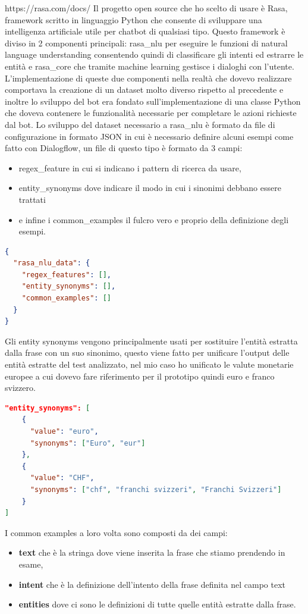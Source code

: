 https://rasa.com/docs/
\fi
Il progetto open source che ho scelto di usare è Rasa, framework scritto in linguaggio Python che consente di sviluppare una intelligenza artificiale utile per chatbot di qualsiasi tipo.
Questo framework è diviso in 2 componenti principali: rasa\_nlu per eseguire le funzioni di natural language understanding consentendo quindi di classificare gli intenti ed estrarre le entità e rasa\_core che tramite machine learning gestisce i dialoghi con l'utente.
L'implementazione di queste due componenti nella realtà che dovevo realizzare comportava la creazione di un dataset molto diverso rispetto al precedente e inoltre lo sviluppo del bot era fondato sull'implementazione di una classe Python che doveva contenere le funzionalità necessarie per completare le azioni richieste dal bot.
Lo sviluppo del dataset necessario a rasa\_nlu è formato da file di configurazione in formato JSON in cui è necessario definire alcuni esempi come fatto con Dialogflow, un file di questo tipo è formato da 3 campi:
\begin{itemize}
\item regex\_feature in cui si indicano i pattern di ricerca da usare,
\item entity\_synonyms dove indicare il modo in cui i sinonimi debbano essere trattati
\item e infine i common\_examples il fulcro vero e proprio della definizione degli esempi.
\end{itemize}
\begin{lstlisting}[language=json,firstnumber=1]
{
  "rasa_nlu_data": {
    "regex_features": [],
    "entity_synonyms": [],
    "common_examples": []
  }
}
\end{lstlisting}
Gli entity synonyms vengono principalmente usati per sostituire l'entità estratta dalla frase con un suo sinonimo, questo viene fatto per unificare l'output delle entità estratte del test analizzato, nel mio caso ho unificato le valute monetarie europee a cui dovevo fare riferimento per il prototipo quindi euro e franco svizzero.
\begin{lstlisting}[language=json,firstnumber=1]
"entity_synonyms": [
    {
      "value": "euro",
      "synonyms": ["Euro", "eur"]
    },
    {
      "value": "CHF",
      "synonyms": ["chf", "franchi svizzeri", "Franchi Svizzeri"]
    }
]
\end{lstlisting}
I common examples a loro volta sono composti da dei campi:
\begin{itemize}
\item \textbf{text} che è la stringa dove viene inserita la frase che stiamo prendendo in esame, \
\item \textbf{intent} che è la definizione dell'intento della frase definita nel campo text
\item \textbf{entities} dove ci sono le definizioni di tutte quelle entità estratte dalla frase.
\end{itemize}
